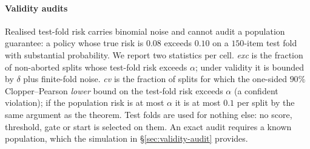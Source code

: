\paragraph{Validity audits}
Realised test-fold risk carries binomial noise and cannot audit a population guarantee: a policy whose true risk is
$0.08$ exceeds $0.10$ on a $150$-item test fold with substantial probability. We report two statistics per
cell. \emph{exc} is the fraction of non-aborted splits whose test-fold risk exceeds $\alpha$; under validity it
is bounded by $\delta$ plus finite-fold noise. \emph{cv} is the fraction of splits for which the one-sided
$90\%$ Clopper--Pearson \emph{lower} bound on the test-fold risk exceeds $\alpha$ (a confident violation); if the
population risk is at most $\alpha$ it is at most $0.1$ per split by the same argument as the theorem. Test folds
are used for nothing else: no score, threshold, gate or start is selected on them. An exact audit requires a known
population, which the simulation in \S\ref{sec:validity-audit} provides.
